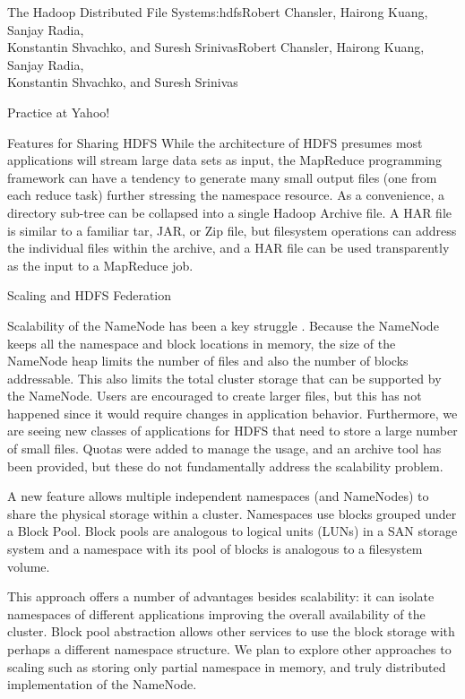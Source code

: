 \begin{aosachaptertoc}{The Hadoop Distributed File System}{s:hdfs}{Robert Chansler, Hairong Kuang, Sanjay Radia, \\ Konstantin Shvachko, and Suresh Srinivas}{Robert Chansler, Hairong Kuang, Sanjay Radia, \\ \hspace*{0.9cm} Konstantin Shvachko, and Suresh Srinivas}
\begin{aosasect1}{Practice at Yahoo!}
\begin{aosasect2}{Features for Sharing HDFS}
While the architecture of HDFS presumes most applications will stream
large data sets as input, the MapReduce programming framework can have
a tendency to generate many small output files (one from each reduce
task) further stressing the namespace resource. As a convenience, a
directory sub-tree can be collapsed into a single Hadoop Archive
file. A HAR file is similar to a familiar tar, JAR, or Zip file, but
filesystem operations can address the individual files within the
archive, and a HAR file can be used transparently as the input to a
MapReduce job.

\end{aosasect2}

\begin{aosasect2}{Scaling and HDFS Federation}

Scalability of the NameNode has been a key struggle
\cite{bib:shvachko:hdfs}.  Because the NameNode keeps all the
namespace and block locations in memory, the size of the NameNode heap
limits the number of files and also the number of blocks
addressable. This also limits the total cluster storage that can be
supported by the NameNode. Users are encouraged to create larger
files, but this has not happened since it would require changes in
application behavior. Furthermore, we are seeing new classes of
applications for HDFS that need to store a large number of small
files. Quotas were added to manage the usage, and an archive tool has
been provided, but these do not fundamentally address the
scalability problem.

A new feature allows multiple independent namespaces (and NameNodes)
to share the physical storage within a cluster. Namespaces use blocks
grouped under a Block Pool. Block pools are analogous to logical units (LUNs) in a SAN
storage system and a namespace with its pool of blocks is analogous to
a filesystem volume.

This approach offers a number of advantages besides scalability: it
can isolate namespaces of different applications improving the overall
availability of the cluster. Block pool abstraction allows other
services to use the block storage with perhaps a different namespace
structure. We plan to explore other approaches to scaling such as
storing only partial namespace in memory, and truly distributed
implementation of the NameNode.


\end{aosasect2}
\end{aosasect1}
\end{aosachaptertoc}
